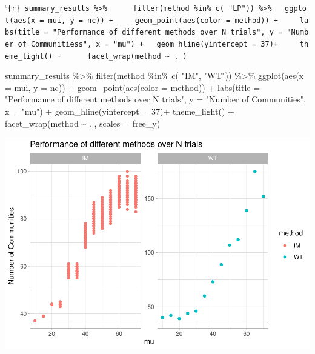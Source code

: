 \documentclass[
]{article}
\newenvironment{Shaded}{\begin{snugshade}}{\end{snugshade}}
\newcommand{\AttributeTok}[1]{\textcolor[rgb]{0.77,0.63,0.00}{#1}}
\newcommand{\DecValTok}[1]{\textcolor[rgb]{0.00,0.00,0.81}{#1}}
\newcommand{\FunctionTok}[1]{\textcolor[rgb]{0.00,0.00,0.00}{#1}}
\newcommand{\NormalTok}[1]{#1}
\newcommand{\SpecialCharTok}[1]{\textcolor[rgb]{0.00,0.00,0.00}{#1}}
\newcommand{\StringTok}[1]{\textcolor[rgb]{0.31,0.60,0.02}{#1}}
\begin{document}
`\texttt{\{r\}\ summary\_results\ \%\textgreater{}\%\ \ \ \ \ \ filter(method\ \%in\%\ c(\ "LP"))\ \%\textgreater{}\%\ \ \ ggplot(aes(x\ =\ mui,\ y\ =\ nc))\ +\ \ \ \ \ geom\_point(aes(color\ =\ method))\ +\ \ \ \ \ labs(title\ =\ "Performance\ of\ different\ methods\ over\ N\ trials",\ y\ =\ "Number\ of\ Communitiess",\ x\ =\ "mu")\ +\ \ \ geom\_hline(yintercept\ =\ 37)+\ \ \ \ \ theme\_light()\ +\ \ \ \ \ \ facet\_wrap(method\ \textasciitilde{}\ .\ )}

\begin{Shaded}
\begin{Highlighting}[]
\NormalTok{summary\_results }\SpecialCharTok{\%\textgreater{}\%} 
    \FunctionTok{filter}\NormalTok{(method }\SpecialCharTok{\%in\%} \FunctionTok{c}\NormalTok{( }\StringTok{"IM"}\NormalTok{,  }\StringTok{"WT"}\NormalTok{)) }\SpecialCharTok{\%\textgreater{}\%}
  \FunctionTok{ggplot}\NormalTok{(}\FunctionTok{aes}\NormalTok{(}\AttributeTok{x =}\NormalTok{ mui, }\AttributeTok{y =}\NormalTok{ nc)) }\SpecialCharTok{+}
    \FunctionTok{geom\_point}\NormalTok{(}\FunctionTok{aes}\NormalTok{(}\AttributeTok{color =}\NormalTok{ method)) }\SpecialCharTok{+}
    \FunctionTok{labs}\NormalTok{(}\AttributeTok{title =} \StringTok{"Performance of different methods over N trials"}\NormalTok{, }\AttributeTok{y =} \StringTok{"Number of Communities"}\NormalTok{, }\AttributeTok{x =} \StringTok{"mu"}\NormalTok{) }\SpecialCharTok{+}
  \FunctionTok{geom\_hline}\NormalTok{(}\AttributeTok{yintercept =} \DecValTok{37}\NormalTok{)}\SpecialCharTok{+}
    \FunctionTok{theme\_light}\NormalTok{() }\SpecialCharTok{+} 
    \FunctionTok{facet\_wrap}\NormalTok{(method }\SpecialCharTok{\textasciitilde{}}\NormalTok{ . , }\AttributeTok{scales =} \StringTok{\textquotesingle{}free\_y\textquotesingle{}}\NormalTok{)}
\end{Highlighting}
\end{Shaded}

\includegraphics{com_det_algorithms_files/figure-latex/unnamed-chunk-22-1.pdf}
\end{document}
